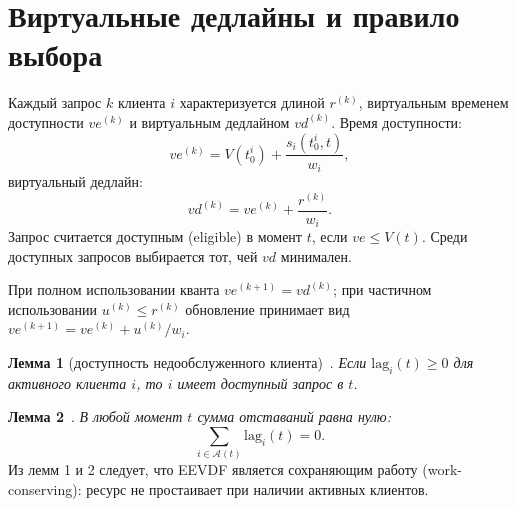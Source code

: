 \documentclass[12pt, oneside]{book}
\newenvironment{customquote}
{\list{}{\leftmargin=0.5cm
                \rightmargin=0.5cm
                \topsep=0pt
                \partopsep=0pt
                \parsep=2pt
                \itemsep=0pt
        }%
        \normalfont\relax
\item\relax}
{\endlist}
\begin{document}
\section{Виртуальные дедлайны и правило выбора}
\begin{customquote}
        \quad Каждый запрос $k$ клиента $i$ характеризуется
        длиной $r^{(k)}$, виртуальным временем доступности
        $ve^{(k)}$ и виртуальным дедлайном $vd^{(k)}$.
        Время доступности:
        \begin{equation}
                ve^{(k)} = V(t_0^i) + \frac{s_i(t_0^i, t)}{w_i},
        \end{equation}
        виртуальный дедлайн:
        \begin{equation}
                vd^{(k)} = ve^{(k)} + \frac{r^{(k)}}{w_i}.
        \end{equation}
        Запрос считается доступным (eligible) в момент $t$,
        если $ve \leq V(t)$. Среди доступных запросов
        выбирается тот, чей $vd$ минимален.

        \quad При полном использовании кванта
        $ve^{(k+1)} = vd^{(k)}$; при частичном использовании
        $u^{(k)} \leq r^{(k)}$ обновление принимает вид
        $ve^{(k+1)} = ve^{(k)} + u^{(k)} / w_i$.

        \textbf{Лемма 1} (доступность недообслуженного
        клиента)~\cite{stoica}.
        \textit{Если $\mathrm{lag}_i(t) \geq 0$ для активного
        клиента $i$, то $i$ имеет доступный запрос в $t$.}

        \textbf{Лемма 2}~\cite{stoica}.
        \textit{В любой момент $t$ сумма отставаний равна нулю:}
        \begin{equation}
                \sum_{i \in \mathcal{A}(t)} \mathrm{lag}_i(t) = 0.
        \end{equation}
        Из лемм 1 и 2 следует, что EEVDF является
        сохраняющим работу (work-conserving): ресурс не
        простаивает при наличии активных клиентов.
\end{customquote}
\end{document}
